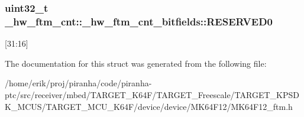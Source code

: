 \subsubsection[{\texorpdfstring{R\+E\+S\+E\+R\+V\+E\+D0}{RESERVED0}}]{\setlength{\rightskip}{0pt plus 5cm}uint32\+\_\+t \+\_\+hw\+\_\+ftm\+\_\+cnt\+::\+\_\+hw\+\_\+ftm\+\_\+cnt\+\_\+bitfields\+::\+R\+E\+S\+E\+R\+V\+E\+D0}\hypertarget{struct__hw__ftm__cnt_1_1__hw__ftm__cnt__bitfields_a63d94de5d40db306b9659bfa98c7ae4c}{}\label{struct__hw__ftm__cnt_1_1__hw__ftm__cnt__bitfields_a63d94de5d40db306b9659bfa98c7ae4c}
\mbox{[}31\+:16\mbox{]} 

The documentation for this struct was generated from the following file\+:\begin{DoxyCompactItemize}
\item 
/home/erik/proj/piranha/code/piranha-\/ptc/src/receiver/mbed/\+T\+A\+R\+G\+E\+T\+\_\+\+K64\+F/\+T\+A\+R\+G\+E\+T\+\_\+\+Freescale/\+T\+A\+R\+G\+E\+T\+\_\+\+K\+P\+S\+D\+K\+\_\+\+M\+C\+U\+S/\+T\+A\+R\+G\+E\+T\+\_\+\+M\+C\+U\+\_\+\+K64\+F/device/device/\+M\+K64\+F12/M\+K64\+F12\+\_\+ftm.\+h\end{DoxyCompactItemize}
